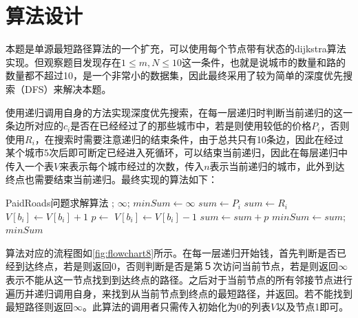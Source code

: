\documentclass{report}
\begin{document}
\section{算法设计}
\label{sec:suan_fa_she_ji_8}
本题是单源最短路径算法的一个扩充，可以使用每个节点带有状态的dijkstra算法实现。但观察题目发现存在$1 \leq m, N \leq 10$这一条件，也就是说城市的数量和路的数量都不超过10，是一个非常小的数据集，因此最终采用了较为简单的深度优先搜索（DFS）来解决本题。\par
使用递归调用自身的方法实现深度优先搜索，在每一层递归时判断当前递归的这一条边所对应的$c_i$是否在已经经过了的那些城市中，若是则使用较低的价格$P_i$，否则使用$R_i$，在搜索时需要注意递归的结束条件，由于总共只有10条边，因此在经过某个城市5次后即可断定已经进入死循环，可以结束当前递归，因此在每层递归中传入一个表$V$来表示每个城市经过的次数，传入$n$表示当前递归的城市，此外到达终点也需要结束当前递归。最终实现的算法如下：
\begin{simpleAlgorithm}{PaidRoads问题求解算法}
            \State {};
        \EndIf
            \State \Return $\infty$;
        \EndIf
        \State $minSum \gets \infty$
         
                \State $sum \gets P_i$
            \Else
                \State $sum \gets R_i$
            \EndIf
            \State $V[b_i] \gets V[b_i] + 1$
            \State $p \gets $  
            \State $V[b_i] \gets V[b_i] - 1$
                \State $sum \gets sum + p$
                    \State $minSum \gets sum$;
                \EndIf
            \EndIf
        \EndFor
        \State \Return $minSum$
    \EndProcedure
\end{simpleAlgorithm}

算法对应的流程图如\ref{fig:flowchart8}所示。在每一层递归开始钱，首先判断是否已经到达终点，若是则返回0，否则判断是否是第５次访问当前节点，若是则返回$\infty$表示不能从这一节点找到到达终点的路径。之后对于当前节点的所有邻接节点进行遍历并递归调用自身，来找到从当前节点到终点的最短路径，并返回。若不能找到最短路径则返回$\infty$。此算法的调用者只需传入初始化为0的列表$V$以及节点1即可。
\end{document}
